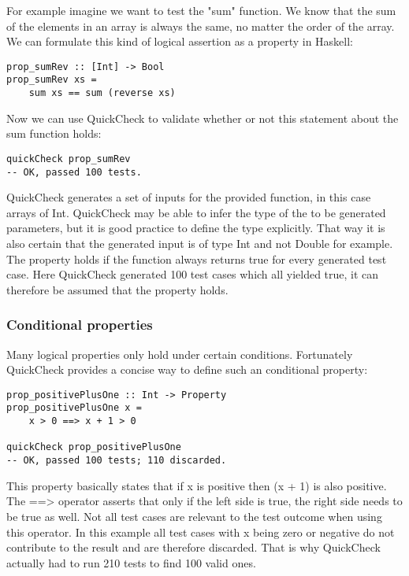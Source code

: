 \documentclass[a4paper, 12pt]{article} %
\begin{document}
For example imagine we want to test the "sum" function. We know that the sum of the elements in an array is always the same, no matter the order of the array. We can formulate this kind of logical assertion as a property in Haskell:

\begin{verbatim}
prop_sumRev :: [Int] -> Bool
prop_sumRev xs = 
    sum xs == sum (reverse xs)
\end{verbatim}

Now we can use QuickCheck to validate whether or not this statement about the sum function holds:

\begin{verbatim}
quickCheck prop_sumRev
-- OK, passed 100 tests.
\end{verbatim}

QuickCheck generates a set of inputs for the provided function, in this case arrays of Int. QuickCheck may be able to infer the type of the to be generated parameters, but it is good practice to define the type explicitly. That way it is also certain that the generated input is of type Int and not Double for example. The property holds if the function always returns true for every generated test case. \cite{Claessen2000} Here QuickCheck generated 100 test cases which all yielded true, it can therefore be assumed that the property holds.

\subsubsection{Conditional properties}

Many logical properties only hold under certain conditions. Fortunately QuickCheck provides a concise way to define such an conditional property:

\begin{verbatim}
prop_positivePlusOne :: Int -> Property
prop_positivePlusOne x = 
    x > 0 ==> x + 1 > 0

quickCheck prop_positivePlusOne  
-- OK, passed 100 tests; 110 discarded.
\end{verbatim}

This property basically states that if x is positive then (x + 1) is also positive. The ==\textgreater{} operator asserts that only if the left side is true, the right side needs to be true as well. \cite{Claessen2000} Not all test cases are relevant to the test outcome when using this operator. In this example all test cases with x being zero or negative do not contribute to the result and are therefore discarded. That is why QuickCheck actually had to run 210 tests to find 100 valid ones.  
\end{document}
